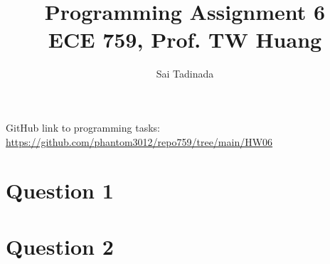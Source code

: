 \documentclass[12pt]{article}
\title{Programming Assignment 6 \\ \small{ECE 759, Prof. TW Huang}}
\author{Sai Tadinada}
\date{}
\begin{document}
\maketitle

GitHub link to programming tasks: \\ \url{https://github.com/phantom3012/repo759/tree/main/HW06}

\section{Question 1}

\section{Question 2}
\end{document}

